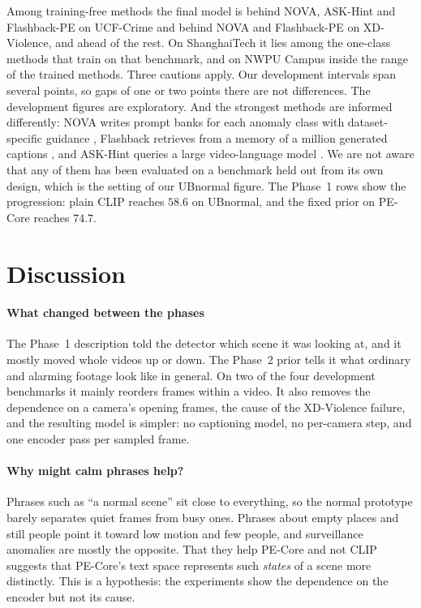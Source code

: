 \documentclass[conference,a4paper]{IEEEtran}
\begin{document}
Among training-free methods the final model is behind NOVA, ASK-Hint and
Flashback-PE on UCF-Crime and behind NOVA and Flashback-PE on XD-Violence, and
ahead of the rest. On ShanghaiTech it lies among the one-class methods that train
on that benchmark, and on NWPU Campus inside the range of the trained methods.
Three cautions apply. Our development intervals span several points, so gaps of
one or two points there are not differences. The development figures are
exploratory. And the strongest methods are informed differently: NOVA writes
prompt banks for each anomaly class with dataset-specific guidance
\cite{yin2026nova}, Flashback retrieves from a memory of a million generated
captions \cite{lee2025flashback}, and ASK-Hint queries a large video-language
model \cite{zou2026askhint}. We are not aware that any of them has been
evaluated on a benchmark held out from its own design, which is the setting of
our UBnormal figure. The Phase~1 rows show the progression: plain CLIP reaches
$58.6$ on UBnormal, and the fixed prior on PE-Core reaches $74.7$.

\section{Discussion}
\label{sec:discussion}

\paragraph*{What changed between the phases}
The Phase~1 description told the detector which scene it was looking at, and it
mostly moved whole videos up or down. The Phase~2 prior tells it what ordinary
and alarming footage look like in general. On two of the four development
benchmarks it mainly reorders frames within a video. It also removes the
dependence on a camera's opening frames, the cause of the XD-Violence failure,
and the resulting model is simpler: no captioning model, no per-camera step, and
one encoder pass per sampled frame.

\paragraph*{Why might calm phrases help?}
Phrases such as ``a normal scene'' sit close to everything, so the normal
prototype barely separates quiet frames from busy ones. Phrases about empty
places and still people point it toward low motion and few people, and
surveillance anomalies are mostly the opposite. That they help PE-Core and not
CLIP suggests that PE-Core's text space represents such \emph{states} of a scene
more distinctly. This is a hypothesis: the experiments show the dependence on the
encoder but not its cause.
\end{document}
